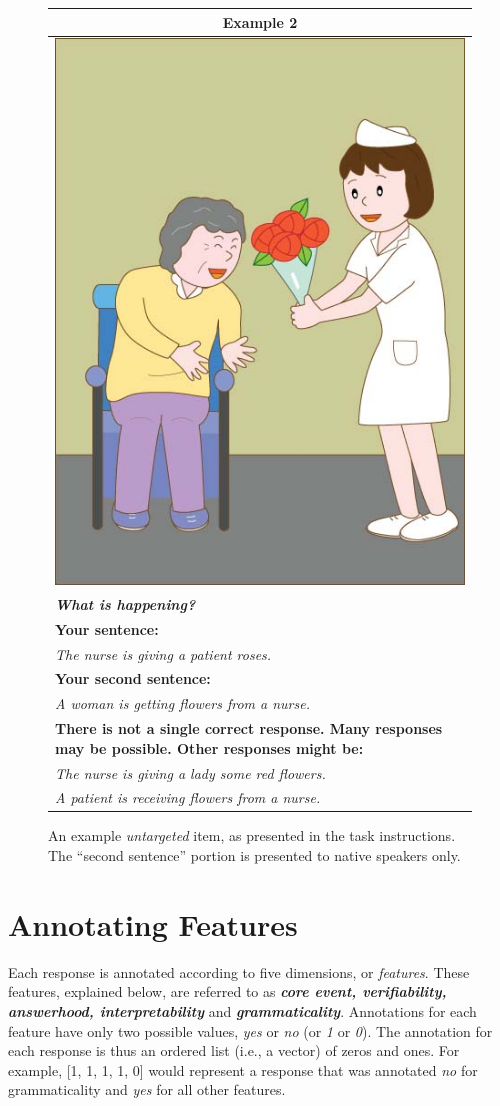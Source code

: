 \documentclass[12pt,notitlepage]{article}
\begin{document}
\begin{figure}[!htb]
\begin{center}
\begin{tabular}{|p{}|}
\hline
\multicolumn{1}{|c|}{\textbf{Example 2}}\\
\hline
\multicolumn{1}{|c|}{\includegraphics[width=0.4\columnwidth,trim=0 0 0 -3]{../figures/ex01.jpg}}\\
\hline
\textbf{\textit{What is happening?}}\\
\hline
\textbf{Your sentence:} \\
\textit{The nurse is giving a patient roses.}\\
\hline
\textbf{Your second sentence:} \\
\textit{A woman is getting flowers from a nurse.} \\
\hline
\textbf{There is not a single correct response. Many responses may be possible. Other responses might be:} \\
\textit{The nurse is giving a lady some red flowers.} \\
\textit{A patient is receiving flowers from a nurse.} \\
\hline
\end{tabular}
\end{center}
\caption{An example \textit{untargeted} item, as presented in the task instructions. The ``second sentence'' portion is presented to native speakers only.}
\label{fig:instructions2}
\end{figure}

\clearpage
\section{Annotating Features}

Each response is annotated according to five dimensions, or \textit{features}. These features, explained below, are referred to as \textit{\textbf{core event, verifiability, answerhood, interpretability}} and \textit{\textbf{grammaticality}}. Annotations for each feature have only two possible values, \textit{yes} or \textit{no} (or \textit{1} or \textit{0}). The annotation for each response is thus an ordered list (i.e., a vector) of zeros and ones. For example, [1, 1, 1, 1, 0] would represent a response that was annotated \textit{no} for grammaticality and \textit{yes} for all other features.
\end{document}
